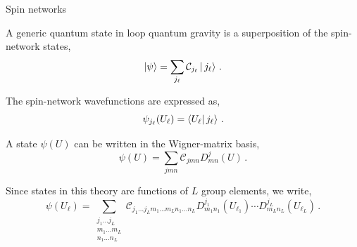 \documentclass[12pt,titlepage]{article}
\begin{document}
\begin{frame}{Spin networks}
    \begin{list}{\,}{\leftmargin=1em \itemindent=0em}
        \item<1-> A generic quantum state in loop quantum gravity is a superposition of the spin-network states,
        \begin{equation}
            \ket{\psi}=\sum_{j_\ell}\mathcal{C}_{j_\ell}\ket{\,{j_\ell}}\,.
        \end{equation}
        \item<2-> The spin-network wavefunctions are expressed as,
        \begin{equation}
            \psi_{j_\ell}(U_\ell)=\braket{U_\ell}{\,j_\ell}\,.
        \end{equation}
        \item<3-> A state $\psi(U)$ can be written in the Wigner-matrix basis,
        \begin{equation}
            \psi(U)=\sum_{jmn}\mathcal{C}_{jmn}D^j_{mn}(U)\,.
        \end{equation}
        \item<4-> Since states in this theory are functions of $L$ group elements, we write,
        \begin{equation}
            \psi(U_\ell)=\sum_{\substack{j_1\dots j_L \\ m_1\dots m_L \\ n_1\dots n_L}}\mathcal{C}_{j_1\dots j_L m_1\dots m_L n_1\dots n_L} D^{j_1}_{m_1n_1}(U_{\ell_1})\cdots D^{j_L}_{m_Ln_L}(U_{\ell_L})\,.
        \end{equation} 
    \end{list}
\end{frame}
\end{document}
